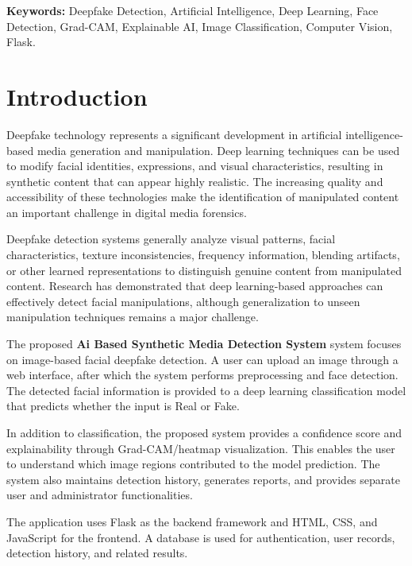 \documentclass[12pt,a4paper,oneside]{report}
\begin{document}
\vspace{0.4cm}

\textbf{Keywords:} Deepfake Detection, Artificial Intelligence, Deep Learning, Face Detection, Grad-CAM, Explainable AI, Image Classification, Computer Vision, Flask.


\chapter{Introduction}
\pagestyle{projectstyle}
\thispagestyle{projectstyle}


Deepfake technology represents a significant development in artificial intelligence-based media generation and manipulation. Deep learning techniques can be used to modify facial identities, expressions, and visual characteristics, resulting in synthetic content that can appear highly realistic. The increasing quality and accessibility of these technologies make the identification of manipulated content an important challenge in digital media forensics.

Deepfake detection systems generally analyze visual patterns, facial characteristics, texture inconsistencies, frequency information, blending artifacts, or other learned representations to distinguish genuine content from manipulated content. Research has demonstrated that deep learning-based approaches can effectively detect facial manipulations, although generalization to unseen manipulation techniques remains a major challenge.

The proposed \textbf{Ai Based Synthetic Media Detection System} system focuses on image-based facial deepfake detection. A user can upload an image through a web interface, after which the system performs preprocessing and face detection. The detected facial information is provided to a deep learning classification model that predicts whether the input is Real or Fake.

In addition to classification, the proposed system provides a confidence score and explainability through Grad-CAM/heatmap visualization. This enables the user to understand which image regions contributed to the model prediction. The system also maintains detection history, generates reports, and provides separate user and administrator functionalities.

The application uses Flask as the backend framework and HTML, CSS, and JavaScript for the frontend. A database is used for authentication, user records, detection history, and related results.
\end{document}
